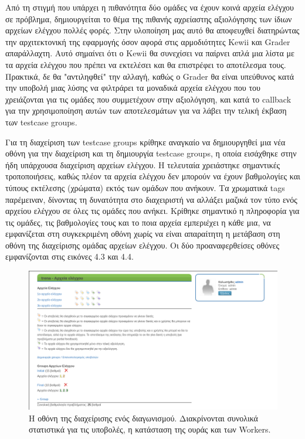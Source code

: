 \documentclass[diploma]{softlab-thesis}
\begin{document}
\bigskip

Από τη στιγμή που υπάρχει η πιθανότητα δύο ομάδες να έχουν κοινά αρχεία ελέγχου
σε πρόβλημα, δημιουργείται το θέμα της πιθανής αχρείαστης αξιολόγησης των ίδιων
αρχείων ελέγχου πολλές φορές. Στην υλοποίηση μας αυτό θα αποφευχθεί διατηρώντας
την αρχιτεκτονική της εφαρμογής όσον αφορά στις αρμοδιότητες Kewii και Grader
απαράλλαχτη. Αυτό σημαίνει ότι ο Kewii θα συνεχίσει να παίρνει απλά μια λίστα
με τα αρχεία ελέγχου που πρέπει να εκτελέσει και θα επιστρέφει το αποτέλεσμα
τους. Πρακτικά, δε θα "αντιληφθεί" την αλλαγή, καθώς ο Grader θα είναι
υπεύθυνος κατά την υποβολή μιας λύσης να φιλτράρει τα μοναδικά αρχεία ελέγχου
που του χρειάζονται για τις ομάδες που συμμετέχουν στην αξιολόγηση, και κατά το
callback για την χρησιμοποίηση αυτών των αποτελεσμάτων για να λάβει την τελική
έκβαση των testcase groups.

\bigskip

Για τη διαχείριση των testcase groups κρίθηκε αναγκαίο να δημιουργηθεί μια νέα
οθόνη για την διαχείριση και τη δημιουργία testcase groups, η οποία εισάχθηκε
στην ήδη υπάρχουσα διαχείριση αρχείων ελέγχου. Η τελευταία χρειάστηκε
σημαντικές τροποποιήσεις, καθώς πλέον τα αρχεία ελέγχου δεν μπορούν να έχουν
βαθμολογίες και τύπους εκτέλεσης (χρώματα) εκτός των ομάδων που ανήκουν. Τα
χρωματικά tags παρέμειναν, δίνοντας τη δυνατότητα στο διαχειριστή να αλλάξει
μαζικά τον τύπο ενός αρχείου ελέγχου σε όλες τις ομάδες που ανήκει. Κρίθηκε
σημαντικό η πληροφορία για τις ομάδες, τις βαθμολογίες τους και το ποια αρχεία
εμπεριέχει η κάθε μια, να εμφανίζεται στη συγκεκριμένη οθόνη χωρίς να είναι
απαραίτητη η μετάβαση στη οθόνη της διαχείρισης ομάδας αρχείων ελέγχου. Οι δύο
προαναφερθείσες οθόνες εμφανίζονται στις εικόνες 4.3 και 4.4.

\bigskip

\begin{figure}
  \centering
  \includegraphics[scale=0.3,trim=4 4 4 4,clip]{Figures/groupoverview.png}
  \caption[Οθόνη διαχείρισης προβλήματος]{Η οθόνη της διαχείρισης ενός διαγωνισμού.
  Διακρίνονται συνολικά στατιστικά για τις υποβολές, η κατάσταση της ουράς και των
  Workers.}
\end{figure}
\end{document}
